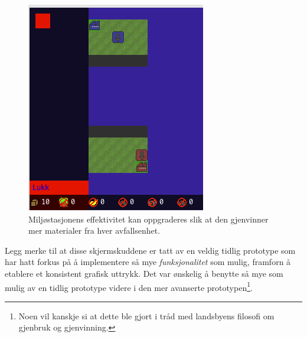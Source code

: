 \begin{figure} [H]
\centering
\includegraphics[scale=0.7]{images/OppgradereEnv.png}
\caption{Miljøstasjonens effektivitet kan oppgraderes slik at den gjenvinner mer materialer fra hver avfallsenhet.}
\label{fig:OppgradereEnv}
\end{figure}

Legg merke til at disse skjermskuddene er tatt av en veldig tidlig prototype som har hatt forkus på å implementere så mye \emph{funksjonalitet} som mulig, framforn å etablere et konsistent grafisk uttrykk. Det var ønskelig å benytte så mye som mulig av en tidlig prototype videre i den mer avanserte prototypen\footnote{Noen vil kanskje si at dette ble gjort i tråd med landsbyens filosofi om gjenbruk og gjenvinning.}.